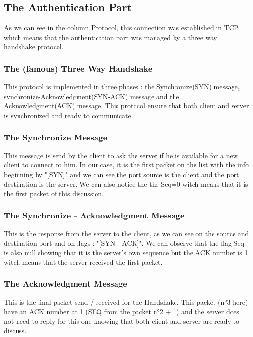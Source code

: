 \documentclass[a4paper]{article}
\begin{document}
\subsection{The Authentication Part}

As we can see in the column Protocol, this connection was established in TCP which means that the authentication part was managed by a three way handshake protocol.

\subsubsection{The (famous) Three Way Handshake}

This protocol is implemented in three phases : the Synchronize(SYN) message, synchronize-Acknowledgment(SYN-ACK) message and the Acknowledgment(ACK) message. This protocol ensure that both client and server is synchronized and ready to communicate.

\subsubsection{The Synchronize Message}

This message is send by the client to ask the server if he is available for a new client to connect to him.
In our case, it is the first packet on the list with the info beginning by "[SYN]" and we can see the port source is the client and the port destination is the server.
We can also notice the the Seq=0 witch means that it is the first packet of this discussion.

\subsubsection{The Synchronize - Acknowledgment Message}

This is the response from the server to the client, as we can see on the source and destination port and on flags : "[SYN - ACK]".
We can observe that the flag Seq is also null showing that it is the server's own sequence but the ACK number is 1 witch means that the server received the first packet.

\subsubsection{The Acknowledgment Message}

This is the final packet send / received for the Handshake. This packet (n°3 here) have an ACK number at 1 (SEQ from the packet n°2 + 1) and the server does not need to reply for this one knowing that both client and server are ready to discuss.
\end{document}
